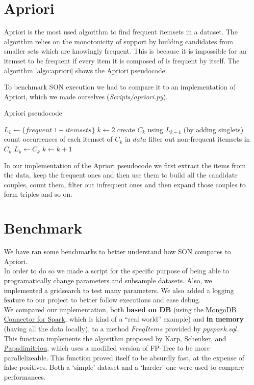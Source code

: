\documentclass[a4paper]{article}
\begin{document}
	\newpage
	
	\section{Apriori}
	\label{section:apriori}
	
	Apriori is the most used algorithm to find frequent itemsets in a dataset. The algorithm relies on the monotonicity of support by building candidates from smaller sets which are knowingly frequent. This is because it is impossible for an itemset to be frequent if every item it is composed of is frequent by itself. The algorithm \ref{algo:apriori} shows the Apriori pseudocode.
	
	To benchmark SON execution we had to compare it to an implementation of Apriori, which we made ourselves (\textit{Scripts/apriori.py}).
	
\begin{algorithm}
\caption{Apriori pseudocode}
\label{algo:apriori}
\begin{algorithmic}[1]
	\State $L_1 \gets \{frequent \ 1-itemsets\}$
    	\State $k \gets 2$
    		\State create $C_k$ using $L_{k-1}$ (by adding singlets)
    		\State count occurrences of each itemset of $C_k$ in $data$
    		\State filter out non-frequent itemsets in $C_k$
    		\State $L_k \gets C_k$
    		\State $k \gets k+1$
    	\EndWhile
\EndFunction
\end{algorithmic}
\end{algorithm}

    In our implementation of the Apriori pseudocode we first extract the items from the data, keep the frequent ones and then use them to build all the candidate couples, count them, filter out infrequent ones and then expand those couples to form triples and so on.
	
	\section{Benchmark}
	We have ran some benchmarks to better understand how SON compares to Apriori.\\
	In order to do so we made a script for the specific purpose of being able to programatically change parameters and 	subsample datasets.
	Also, we implemented a gridsearch to test many parameters. We also added a logging feature to our project to better follow executions and ease debug.\\
	We compared our implementation, both \textbf{based on DB} (using the \href{https://www.mongodb.com/docs/spark-connector/current/}{MongoDB Connector for Spark}, which is kind of a ``real world'' example) and \textbf{in memory} (having all the data locally), to a method $FreqItems$ provided by $pyspark.sql$. 
	This function implements the algorithm proposed by \href{https://doi.org/10.1145/762471.762473}{Karp, Schenker, and Papadimitriou}, which uses a modified version of FP-Tree to be more parallelizeable. This function proved itself to be absurdly fast, at the expense of false positives.
	Both a  `simple' dataset and a `harder' one were used to compare performances.
\end{document}
